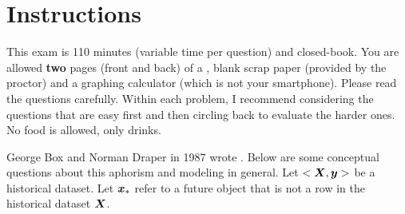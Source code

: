 \documentclass[12pt]{article}
\begin{document}
\section*{Instructions}
This exam is 110 minutes (variable time per question) and closed-book. You are allowed \textbf{two} pages (front and back) of a , blank scrap paper (provided by the proctor) and a graphing calculator (which is not your smartphone). Please read the questions carefully. Within each problem, I recommend considering the questions that are easy first and then circling back to evaluate the harder ones. No food is allowed, only drinks. %

\pagebreak

\problem  George Box and Norman Draper in 1987 wrote . Below are some conceptual questions about this aphorism and modeling in general. Let $<\boldsymbol{X}, \boldsymbol{y}>$ be a historical dataset. Let $\boldsymbol{x}_*$ refer to a future object that is not a row in the historical dataset $\boldsymbol{X}$.
\end{document}

